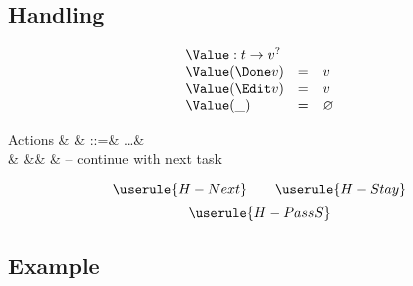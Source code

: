 \subsection{Handling}

\begin{equation*}
  \begin{array}{lcl}
    \multicolumn{3}{l}{\Value : t \to v^?} \\
    \Value(\Done v) &=& v \\
    \Value(\Edit v) &=& v \\
    \Value(\_)      &=& \nothing
  \end{array}
\end{equation*}

\begin{grammar}
  Actions
    & \alpha & ::=& \ldots & \\
    &        &\mid& \Next  & – continue with next task \\
\end{grammar}

\begin{equation*}
  \userule{H-Next} \qquad \userule{H-Stay}
\end{equation*}
\begin{equation*}
  \userule{H-PassS}
\end{equation*}

\subsection{Example}
